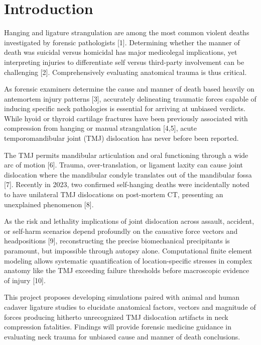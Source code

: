 \documentclass{article}
\begin{document}
\section{Introduction}

Hanging and ligature strangulation are among the most common violent deaths investigated by forensic pathologists [1]. Determining whether the manner of death was suicidal versus homicidal has major medicolegal implications, yet interpreting injuries to differentiate self versus third-party involvement can be challenging [2]. Comprehensively evaluating anatomical trauma is thus critical.  

As forensic examiners determine the cause and manner of death based heavily on antemortem injury patterns [3], accurately delineating traumatic forces capable of inducing specific neck pathologies is essential for arriving at unbiased verdicts. While hyoid or thyroid cartilage fractures have been previously associated with compression from hanging or manual strangulation [4,5], acute temporomandibular joint (TMJ) dislocation has never before been reported.

The TMJ permits mandibular articulation and oral functioning through a wide arc of motion [6]. Trauma, over-translation, or ligament laxity can cause joint dislocation where the mandibular condyle translates out of the mandibular fossa [7]. Recently in 2023, two confirmed self-hanging deaths were incidentally noted to have unilateral TMJ dislocations on post-mortem CT, presenting an unexplained phenomenon [8]. 

As the risk and lethality implications of joint dislocation across assault, accident, or self-harm scenarios depend profoundly on the causative force vectors and headpositions [9], reconstructing the precise biomechanical precipitants is paramount, but impossible through autopsy alone. Computational finite element modeling allows systematic quantification of location-specific stresses in complex anatomy like the TMJ exceeding failure thresholds before macroscopic evidence of injury [10].

This project proposes developing simulations paired with animal and human cadaver ligature studies to elucidate anatomical factors, vectors and magnitude of forces producing hitherto unrecognized TMJ dislocation artifacts in neck compression fatalities. Findings will provide forensic medicine guidance in evaluating neck trauma for unbiased cause and manner of death conclusions. 
\end{document}
